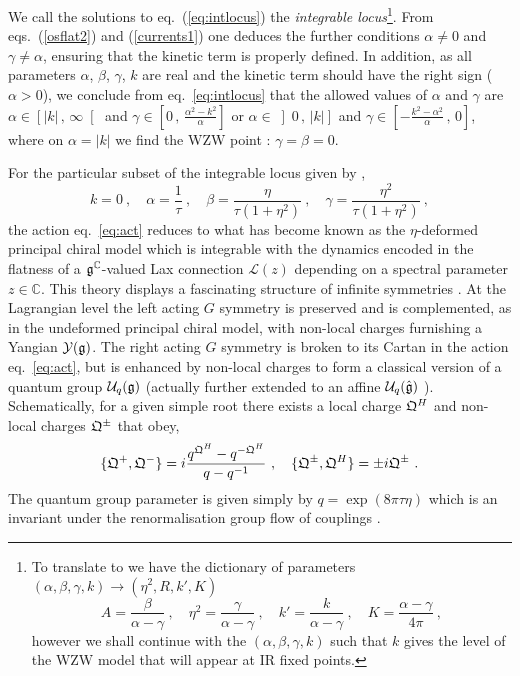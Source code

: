 \documentclass[12pt]{article}
\def\Lax{{\mathscr L}}
\def\ee{\boldsymbol{e}}
\def\be{\begin{equation}}
\def\ee{\end{equation}}
\begin{document}
    We call the solutions to eq.~(\ref{eq:intlocus})  the {\em integrable locus}\footnote{To translate to    \cite{Delduc:2014uaa}   we have the dictionary of parameters $(\alpha, \beta, \gamma, k) \to (\eta^2,R, k', K)$ 
    \be
    A = \frac{\beta}{\alpha- \gamma} \ , \quad \eta^2 = \frac{\gamma}{\alpha  -\gamma} \ , \quad  k' = \frac{k}{\alpha - \gamma} \ , \quad  K= \frac{\alpha- \gamma}{4\pi} \ ,
    \ee
    however we shall continue with the $(\alpha, \beta, \gamma, k)$   such that $k$ gives the level of the WZW model that will appear at IR fixed points.  }. From eqs.~(\ref{osflat2}) and (\ref{currents1}) one deduces the further conditions $ \alpha \neq 0$ and $ \gamma \neq \alpha $, ensuring that the kinetic term is properly defined. In addition, as all parameters $\alpha $, $ \beta $, $\gamma$, $k$ are real and the kinetic term should have the right sign ($\alpha>0$), we conclude from eq.~\eqref{eq:intlocus} that the allowed values of $\alpha$ and $\gamma$ are $\alpha \in \left[ |k|\, ,\, \infty \right[$ and $\gamma \in \left[0\, ,\,\frac{\alpha^{2}-k^{2}}{\alpha} \right] $ or $ \alpha \in \left] 0\, ,\,|k|\right]$ and $\gamma \in \left[- \frac{k^{2}-\alpha^{2}}{\alpha}\, ,\,0 \right]$, where on $\alpha = |k|$ we find the WZW point \cite{Witten:1983ar}: $\gamma = \beta = 0$.
   
   For the particular subset of the integrable locus given by \cite{Klimcik:2002zj},
   \be
   k = 0 \ , \quad \alpha = \frac{1}{\tau} \ , \quad \beta = \frac{\eta}{\tau(1+\eta^2)} \ , \quad \gamma = \frac{\eta^2}{\tau(1+\eta^2) }  \ , 
   \ee
 the action eq.~\eqref{eq:act} reduces to what has become known as the $\eta$-deformed principal chiral model which is integrable \cite{Klimcik:2008eq} with the dynamics encoded in the flatness of a $\frak{g}^{\mathbb{C}}$-valued Lax connection $\Lax(z)$ depending on a spectral parameter $z\in \mathbb{C}$.  This theory displays a fascinating structure of infinite symmetries \cite{Delduc:2013fga}. At the Lagrangian level the left acting $G$ symmetry is preserved  and is complemented, as in the undeformed principal chiral model, with non-local charges furnishing a Yangian ${\cal Y}(\frak{g})$.  The right acting $G$ symmetry  is broken to its Cartan in the   action eq.~\eqref{eq:act},  but is enhanced by  non-local charges to form a classical version of a quantum group ${\cal U}_q( \frak{g})$  \cite{Delduc:2013fga} (actually   further extended to an affine ${\cal U}_q( \hat{ \frak{g}} )$   \cite{Delduc:2017brb}).  Schematically,   for a given simple root there exists a local charge $\frak{Q}^H $ and non-local charges $\frak{Q}^\pm$   that obey,
 \be
 \{ \frak{Q}^+, \frak{Q}^- \}  =   i \frac{q^{\frak{Q}^H} - q^{- \frak{Q}^H}  }{q -q^{-1} } \ , \quad  \{ \frak{Q}^\pm, \frak{Q}^H \}  =  \pm i \frak{Q}^\pm \ . 
 \ee 
 The quantum group parameter is given simply by $q= \exp( 8 \pi \tau \eta)$ which is an invariant under the renormalisation group flow of couplings \cite{Sfetsos:2015nya}. 
  
\end{document}
